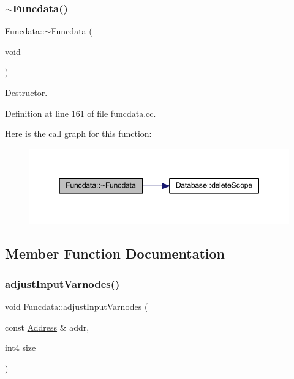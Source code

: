 \subsubsection{\texorpdfstring{$\sim$Funcdata()}{~Funcdata()}}
{\footnotesize\ttfamily Funcdata\+::$\sim$\+Funcdata (\begin{DoxyParamCaption}\item[{void}]{ }\end{DoxyParamCaption})}



Destructor. 



Definition at line 161 of file funcdata.\+cc.

Here is the call graph for this function\+:
\nopagebreak
\begin{figure}[H]
\begin{center}
\leavevmode
\includegraphics[width=344pt]{class_funcdata_a0b4fb40eeb52f948ca7a14187a21c7db_cgraph}
\end{center}
\end{figure}


\subsection{Member Function Documentation}
\mbox{\label{class_funcdata_a35c51952540dbda3f11962b22c3064a3}} 
\subsubsection{\texorpdfstring{adjustInputVarnodes()}{adjustInputVarnodes()}}
{\footnotesize\ttfamily void Funcdata\+::adjust\+Input\+Varnodes (\begin{DoxyParamCaption}\item[{const \mbox{\hyperlink{class_address}{Address}} \&}]{addr,  }\item[{int4}]{size }\end{DoxyParamCaption})}



